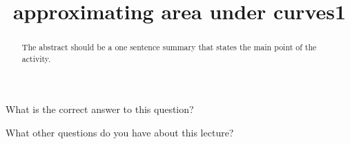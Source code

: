 \documentclass{ximera}
\title{approximating area under curves1}
\begin{document}
\begin{abstract}
  The abstract should be a one sentence summary that states the main point of the activity.
\end{abstract}

\maketitle

\begin{question}
  What is the correct answer to this question?

  
    \begin{multipleChoice}
    \end{multipleChoice}  
  
\end{question}

What other questions do you have about this lecture?
\begin{question}
  \begin{freeResponse}
  \end{freeRepsonse}
\end{question}
\end{document}

